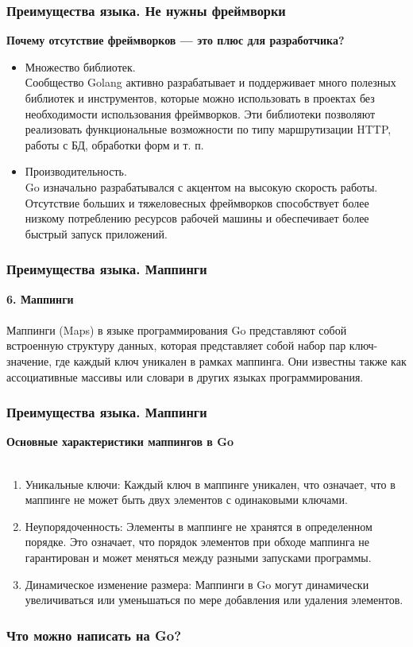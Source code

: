 \documentclass{beamer}
\begin{document}
\begin{frame}[fragile] \frametitle{Преимущества языка. Не нужны фреймворки}
  \textbf{Почему отсутствие фреймворков — это плюс для разработчика?}
  \begin{itemize}
    \item Множество библиотек.
    \\
    Сообщество Golang активно разрабатывает и поддерживает много полезных
    библиотек и инструментов, которые можно использовать в проектах без
    необходимости использования фреймворков. Эти библиотеки позволяют
    реализовать функциональные возможности по типу маршрутизации HTTP, работы с
    БД, обработки форм и т. п.
    
    \item Производительность. 
    \\
    Go изначально разрабатывался с акцентом на высокую скорость работы.
    Отсутствие больших и тяжеловесных фреймворков способствует более низкому
    потреблению ресурсов рабочей машины и обеспечивает более быстрый запуск
    приложений.
  \end{itemize}
\end{frame}
\begin{frame}[fragile] \frametitle{Преимущества языка. Маппинги}
  \textbf{6. Маппинги}
  \\\\
  Маппинги (Maps) в языке программирования Go представляют собой встроенную
  структуру данных, которая представляет собой набор пар ключ-значение, где
  каждый ключ уникален в рамках маппинга. Они известны также как ассоциативные
  массивы или словари в других языках программирования.
\end{frame}
\begin{frame}[fragile] \frametitle{Преимущества языка. Маппинги}
  \textbf{Основные характеристики маппингов в Go}
  \\\\
  \begin{enumerate}
    \item Уникальные ключи: Каждый ключ в маппинге уникален, что означает, что в
    маппинге не может быть двух элементов с одинаковыми ключами.
    \item Неупорядоченность: Элементы в маппинге не хранятся в определенном
    порядке. Это означает, что порядок элементов при обходе маппинга не
    гарантирован и может меняться между разными запусками программы.
    \item Динамическое изменение размера: Маппинги в Go могут динамически
    увеличиваться или уменьшаться по мере добавления или удаления элементов.
  \end{enumerate}
\end{frame}
\begin{frame}[fragile] \frametitle{Что можно написать на Go?}

\end{frame}
\end{document}
